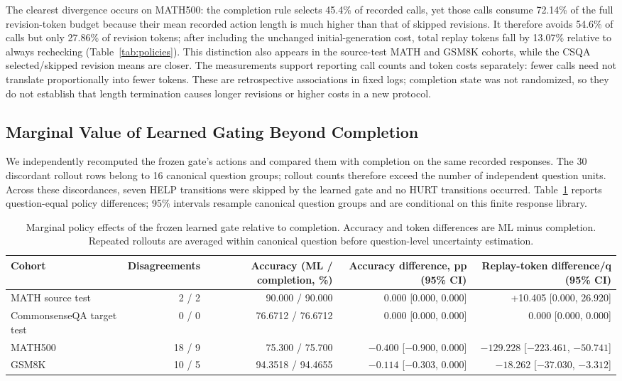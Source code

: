 \documentclass[conference]{IEEEtran}
\begin{document}
The clearest divergence occurs on MATH500: the completion rule selects 45.4\% of recorded calls, yet those calls consume 72.14\% of the full revision-token budget because their mean recorded action length is much higher than that of skipped revisions. It therefore avoids 54.6\% of calls but only 27.86\% of revision tokens; after including the unchanged initial-generation cost, total replay tokens fall by 13.07\% relative to always rechecking (Table~\ref{tab:policies}). This distinction also appears in the source-test MATH and GSM8K cohorts, while the CSQA selected/skipped revision means are closer. The measurements support reporting call counts and token costs separately: fewer calls need not translate proportionally into fewer tokens. These are retrospective associations in fixed logs; completion state was not randomized, so they do not establish that length termination causes longer revisions or higher costs in a new protocol.

\subsection{Marginal Value of Learned Gating Beyond Completion}
We independently recomputed the frozen gate's actions and compared them with completion on the same recorded responses. The 30 discordant rollout rows belong to 16 canonical question groups; rollout counts therefore exceed the number of independent question units. Across these discordances, seven HELP transitions were skipped by the learned gate and no HURT transitions occurred. Table~\ref{tab:gate-marginal} reports question-equal policy differences; 95\% intervals resample canonical question groups and are conditional on this finite response library.

\begin{table}[t]
\caption{Marginal policy effects of the frozen learned gate relative to completion. Accuracy and token differences are ML minus completion. Repeated rollouts are averaged within canonical question before question-level uncertainty estimation.}
\label{tab:gate-marginal}
\centering\scriptsize
\begin{tabular}{lrrrr}
\toprule
\textbf{Cohort} & \textbf{Disagreements} & \textbf{Accuracy (ML / completion, \%)} & \textbf{Accuracy difference, pp (95\% CI)} & \textbf{Replay-token difference/q (95\% CI)}\\
\midrule
MATH source test & 2 / 2 & 90.000 / 90.000 & 0.000 [0.000, 0.000] & +10.405 [0.000, 26.920]\\
CommonsenseQA target test & 0 / 0 & 76.6712 / 76.6712 & 0.000 [0.000, 0.000] & 0.000 [0.000, 0.000]\\
MATH500 & 18 / 9 & 75.300 / 75.700 & $-0.400$ [$-0.900$, 0.000] & $-129.228$ [$-223.461$, $-50.741$]\\
GSM8K & 10 / 5 & 94.3518 / 94.4655 & $-0.114$ [$-0.303$, 0.000] & $-18.262$ [$-37.030$, $-3.312$]\\
\bottomrule
\end{tabular}
\end{table}
\end{document}
